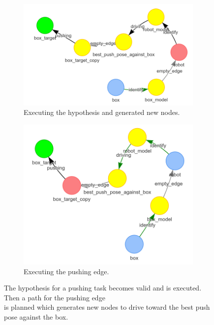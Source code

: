 \begin{figure}[H]
    \centering
    \begin{subfigure}{.45\textwidth}
    \centering
    \includegraphics[width=1\textwidth]{figures/proposed_method/connecting_nodes/robot_push/robot_push_4_new}
    \caption{Executing the hypothesis and generated new nodes.}\label{subfig:robot_push_4}
    \end{subfigure}
    \begin{subfigure}{.45\textwidth}
    \centering
    \includegraphics[width=1\textwidth]{figures/proposed_method/connecting_nodes/robot_push/robot_push_5_new}
    \caption{Executing the pushing edge.}\label{subfig:robot_push_5}
    \end{subfigure}
    \caption{The hypothesis for a pushing task becomes valid and is executed. Then a path for the pushing edge\\is planned which generates new nodes to drive toward the best push pose against the box.}%
    \label{fig:robot_push_2}
\end{figure}

